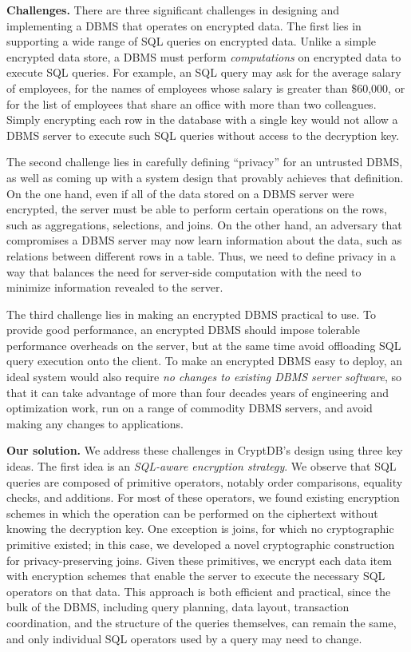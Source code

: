 {\bf Challenges.}  There are three significant challenges in designing
and implementing a DBMS that operates on encrypted data.  The first
lies in supporting a wide range of SQL queries on encrypted data.
Unlike a simple encrypted data store, a DBMS must perform {\em
  computations} on encrypted data to execute SQL queries.  For
example, an SQL query may ask for the average salary of employees, for
the names of employees whose salary is greater than \$60,000, or for
the list of employees that share an office with more than two
colleagues.  Simply encrypting each row in the database with a single
key would not allow a DBMS server to execute such SQL queries without
access to the decryption key.

The second challenge lies in carefully defining ``privacy'' for an
untrusted DBMS, as well as coming up with a system design that
provably achieves that definition.  On the one hand, even if all of
the data stored on a DBMS server were encrypted, the server must be
able to perform certain operations on the rows, such as aggregations,
selections, and joins.  On the other hand, an adversary that
compromises a DBMS server may now learn information about the data,
such as relations between different rows in a table.  Thus, we need to
define privacy in a way that balances the need for server-side
computation with the need to minimize information revealed to the
server.

The third challenge lies in making an encrypted DBMS practical to use.
To provide good performance, an encrypted DBMS should impose tolerable
performance overheads on the server, but at the same time avoid
offloading SQL query execution onto the client.  To make an encrypted
DBMS easy to deploy, an ideal system would also require {\em no
  changes to existing DBMS server software}, so that it can take
advantage of more than four decades years of engineering and
optimization work, run on a range of commodity DBMS servers, and avoid
making any changes to applications.

{\bf Our solution.} We address these challenges in CryptDB's design
using three key ideas.  The first idea is an {\em SQL-aware encryption
  strategy}.  We observe that SQL queries are composed of primitive
operators, notably order comparisons, equality checks, and additions.
For most of these operators, we found existing encryption schemes in
which the operation can be performed on the ciphertext without knowing
the decryption key.  One exception is joins, for which no
cryptographic primitive existed; in this case, we developed a novel
cryptographic construction for privacy-preserving joins.  Given these
primitives, we encrypt each data item with encryption schemes that
enable the server to execute the necessary SQL operators on that data.
This approach is both efficient and practical, since the bulk of the
DBMS, including query planning, data layout, transaction coordination,
and the structure of the queries themselves, can remain the same, and
only individual SQL operators used by a query may need to change.

